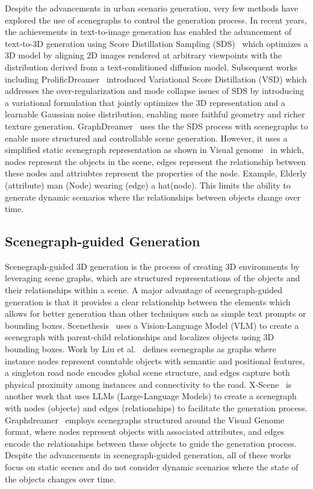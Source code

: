 \documentclass{article}
\begin{document}
Despite the advancements in urban scenario generation, very few methods have explored the use of scenegraphs to control the generation process. In recent years, the achievements in text-to-image generation has enabled the advancement of text-to-3D generation using Score Distillation Sampling (SDS)~\cite{poole2022dreamfusion} which optimizes a 3D model by aligning 2D images rendered at arbitrary viewpoints with the distribution derived from a text-conditioned diffusion model. Subsequent works including ProlificDreamer~\cite{wang2023prolificdreamer} introduced Variational Score Distillation (VSD) which addresses the over-regularization and mode collapse issues of SDS by introducing a variational formulation that jointly optimizes the 3D representation and a learnable Gaussian noise distribution, enabling more faithful geometry and richer texture generation. GraphDreamer~\cite{gao2024graphdreamer}  uses the the SDS process with scenegraphs to enable more structured and controllable scene generation. However, it uses a simplified static scenegraph representation as shown in Visual genome~\cite{krishna2017visual} in which, nodes represent the objects in the scene, edges represent the relationship between these nodes and attriubtes represent the properties of the node. Example, Elderly (attribute) man (Node) wearing (edge) a hat(node). This limits the ability to generate dynamic scenarios where the relationships between objects change over time.


\subsection{Scenegraph-guided Generation}

Scenegraph-guided 3D generation is the process of creating 3D environments by leveraging scene graphs, which are structured representations of the objects and their relationships within a scene. A major advantage of scenegraph-guided generation is that it provides a clear relationship between the elements which allows for better generation than other techniques such as simple text prompts or bounding boxes. Scenethesis~\cite{ling2025scenethesis} uses a Vision-Language Model (VLM) to create a scenegraph with parent-child relationships and localizes objects using 3D bounding boxes. Work by Liu et al.~\cite{liu2025controllable} defines scenegraphs as graphs where instance nodes represent countable objects with semantic and positional features, a singleton road node encodes global scene structure, and edges capture both physical proximity among instances and connectivity to the road. X-Scene~\cite{yang2025x} is another work that uses LLMs (Large-Language Models) to create a scenegraph with nodes (objects) and edges (relationships) to facilitate the generation process. Graphdreamer~\cite{gao2024graphdreamer} employs scenegraphs structured around the Visual Genome~\cite{krishna2017visual} format, where nodes represent objects with associated attributes, and edges encode the relationships between these objects to guide the generation process. Despite the advancements in scenegraph-guided generation, all of these works focus on static scenes and do not consider dynamic scenarios where the state of the objects changes over time.
\end{document}
